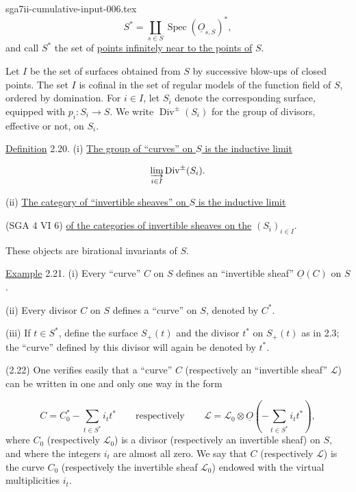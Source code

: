 \begin{filecontents*}{sga7ii-cumulative-input-006.tex}
\begin{equation*}
S^*=\coprod_{s\in S}\operatorname{Spec}(\underline{O}_{s,S})^*,
\end{equation*}
and call $S^*$ the set of \underline{points infinitely near to the points of}
$S$.

Let $I$ be the set of surfaces obtained from $S$ by successive blow-ups of
closed points.  The set $I$ is cofinal in the set of regular models of the
function field of $S$, ordered by domination.  For $i\in I$, let $S_i$ denote
the corresponding surface, equipped with $p_i:S_i\longrightarrow S$.  We write
$\operatorname{Div}^{\pm}(S_i)$ for the group of divisors, effective or not, on
$S_i$.

\underline{Definition} 2.20. (i) \underline{The group of ``curves'' on $S$ is
the inductive limit}

\begin{equation*}
\varinjlim_{i\in I}\operatorname{Div}^{\pm}(S_i).
\end{equation*}

(ii) \underline{The category of ``invertible sheaves'' on $S$ is the inductive
limit}


(SGA 4 VI 6) \underline{of the categories of invertible sheaves on the}
$(S_i)_{i\in I}$.

These objects are birational invariants of $S$.

\underline{Example} 2.21. (i) Every ``curve'' $C$ on $S$ defines an
``invertible sheaf'' $\underline{O}(C)$ on $S$.

(ii) Every divisor $C$ on $S$ defines a ``curve'' on $S$, denoted by $C^*$.

(iii) If $t\in S^*$, define the surface $S_+(t)$ and the divisor $t^*$ on
$S_+(t)$ as in 2.3; the ``curve'' defined by this divisor will again be denoted
by $t^*$.

(2.22) One verifies easily that a ``curve'' $C$ (respectively an ``invertible
sheaf'' $\mathcal L$) can be written in one and only one way in the form

\begin{equation*}
C=C_0^*-\sum_{t\in S^*}i_t t^*
\qquad\text{respectively}\qquad
\mathcal L=\mathcal L_0\otimes\underline{O}
\left(-\sum_{t\in S^*}i_t t^*\right),
\end{equation*}
where $C_0$ (respectively $\mathcal L_0$) is a divisor (respectively an
invertible sheaf) on $S$, and where the integers $i_t$ are almost all zero.  We
say that $C$ (respectively $\mathcal L$) is the curve $C_0$ (respectively the
invertible sheaf $\mathcal L_0$) endowed with the virtual multiplicities $i_t$.


\end{filecontents*}
